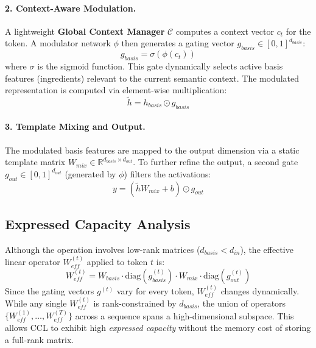 \documentclass[11pt]{article}
\begin{document}
\paragraph{2. Context-Aware Modulation.}
A lightweight \textbf{Global Context Manager} $\mathcal{C}$ computes a context vector $c_t$ for the token. A modulator network $\phi$ then generates a gating vector $g_{basis} \in [0, 1]^{d_{basis}}$:
\begin{equation}
    g_{basis} = \sigma(\phi(c_t))
\end{equation}
where $\sigma$ is the sigmoid function. This gate dynamically selects active basis features (ingredients) relevant to the current semantic context. The modulated representation is computed via element-wise multiplication:
\begin{equation}
    \tilde{h} = h_{basis} \odot g_{basis}
\end{equation}

\paragraph{3. Template Mixing and Output.}
The modulated basis features are mapped to the output dimension via a static template matrix $W_{mix} \in \mathbb{R}^{d_{basis} \times d_{out}}$. To further refine the output, a second gate $g_{out} \in [0, 1]^{d_{out}}$ (generated by $\phi$) filters the activations:
\begin{equation}
    y = (\tilde{h} W_{mix} + b) \odot g_{out}
\end{equation}

\subsection{Expressed Capacity Analysis}
Although the operation involves low-rank matrices ($d_{basis} < d_{in}$), the effective linear operator $W_{eff}^{(t)}$ applied to token $t$ is:
\begin{equation}
    W_{eff}^{(t)} = W_{basis} \cdot \text{diag}(g_{basis}^{(t)}) \cdot W_{mix} \cdot \text{diag}(g_{out}^{(t)})
\end{equation}
Since the gating vectors $g^{(t)}$ vary for every token, $W_{eff}^{(t)}$ changes dynamically. While any single $W_{eff}^{(t)}$ is rank-constrained by $d_{basis}$, the union of operators $\{W_{eff}^{(1)}, \dots, W_{eff}^{(T)}\}$ across a sequence spans a high-dimensional subspace. This allows CCL to exhibit high \textit{expressed capacity} without the memory cost of storing a full-rank matrix.
\end{document}
